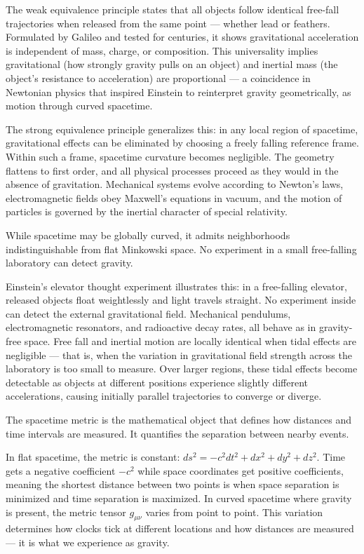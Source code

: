 
The weak equivalence principle states that all objects follow identical free-fall trajectories when released from the same point — whether lead or feathers. Formulated by Galileo and tested for centuries, it shows gravitational acceleration is independent of mass, charge, or composition. This universality implies gravitational (how strongly gravity pulls on an object) and inertial mass (the object's resistance to acceleration) are proportional — a coincidence in Newtonian physics that inspired Einstein to reinterpret gravity geometrically, as motion through curved spacetime.

The strong equivalence principle generalizes this: in any local region of spacetime, gravitational effects can be eliminated by choosing a freely falling reference frame. Within such a frame, spacetime curvature becomes negligible. The geometry flattens to first order, and all physical processes proceed as they would in the absence of gravitation. Mechanical systems evolve according to Newton's laws, electromagnetic fields obey Maxwell's equations in vacuum, and the motion of particles is governed by the inertial character of special relativity.

While spacetime may be globally curved, it admits neighborhoods indistinguishable from flat Minkowski space. No experiment in a small free-falling laboratory can detect gravity.

Einstein's elevator thought experiment illustrates this: in a free-falling elevator, released objects float weightlessly and light travels straight. No experiment inside can detect the external gravitational field. Mechanical pendulums, electromagnetic resonators, and radioactive decay rates, all behave as in gravity-free space. Free fall and inertial motion are locally identical when tidal effects are negligible — that is, when the variation in gravitational field strength across the laboratory is too small to measure. Over larger regions, these tidal effects become detectable as objects at different positions experience slightly different accelerations, causing initially parallel trajectories to converge or diverge.

The spacetime metric is the mathematical object that defines how distances and time intervals are measured. It quantifies the separation between nearby events.

In flat spacetime, the metric is constant: \(ds^2 = -c^2 dt^2 + dx^2 + dy^2 + dz^2\). Time gets a negative coefficient \(-c^2\) while space coordinates get positive coefficients, meaning the shortest distance between two points is when space separation is minimized and time separation is maximized. In curved spacetime where gravity is present, the metric tensor \(g_{\mu\nu}\) varies from point to point. This variation determines how clocks tick at different locations and how distances are measured — it is what we experience as gravity.

